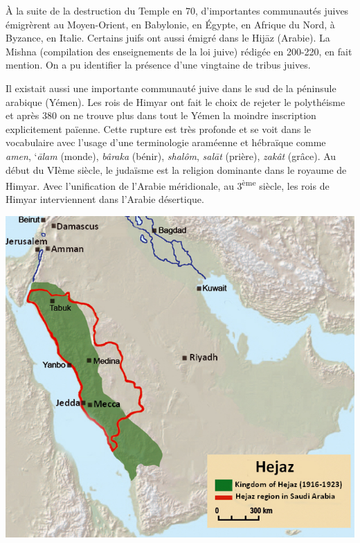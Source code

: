 À la suite de la destruction du Temple en 70, d'importantes communautés
juives émigrèrent au Moyen-Orient, en Babylonie, en Égypte, en Afrique
du Nord, à Byzance, en Italie. Certains juifs ont aussi émigré dans le
Hijāz (Arabie). La Mishna (compilation des enseignements de la loi
juive) rédigée en 200-220, en fait mention. On a pu identifier la
présence d'une vingtaine de tribus juives.

Il existait aussi une importante communauté juive dans le sud de la
péninsule arabique (Yémen). Les rois de Himyar ont fait le choix de
rejeter le polythéisme et après 380 on ne trouve plus dans tout le Yémen
la moindre inscription explicitement païenne. Cette rupture est très
profonde et se voit dans le vocabulaire avec l'usage d'une terminologie
araméenne et hébraïque comme \emph{amen}, `\emph{ālam} (monde),
\emph{bâraka} (bénir), \emph{shalôm}, \emph{salāt} (prière),
\emph{zakât} (grâce). Au début du VIème siècle, le judaïsme est la
religion dominante dans le royaume de Himyar. Avec l'unification de l'Arabie méridionale,
au 3\textsuperscript{ème} siècle, les rois de Himyar interviennent dans
l'Arabie désertique.

\includegraphics[width=\textwidth]{Images/image030.jpg}

